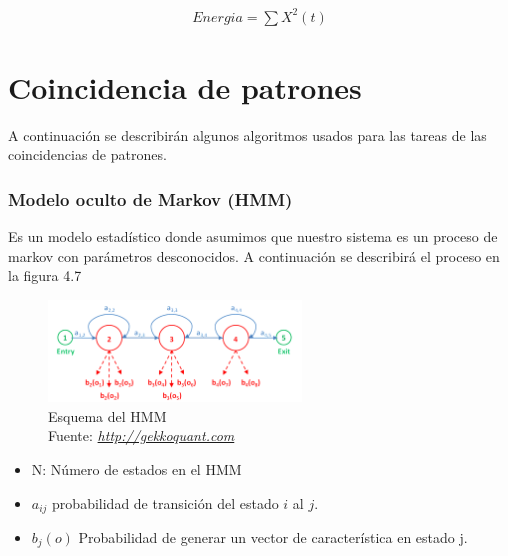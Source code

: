 	\begin{equation}
		\label{energia}
		\begin{aligned}
			Energia=\sum X^{2}(t)
		\end{aligned}
	\end{equation}	




\section{Coincidencia de patrones}
A continuación se describirán algunos algoritmos usados para las tareas de las coincidencias de patrones.

\subsubsection{Modelo oculto de Markov (HMM)}
Es un modelo estadístico donde asumimos que nuestro sistema es un proceso de markov con parámetros desconocidos. A continuación se describirá el proceso en la figura 4.7

\begin{figure}[H]
	\centering
	\includegraphics[width=0.6\textwidth]{Figures/hmm}
	\caption{Esquema del HMM\\ Fuente:  \href{http://gekkoquant.com/2014/05/18/hidden-markov-models-model-description-part-1-of-4/}{\textit{http://gekkoquant.com}}}
	\label{}
\end{figure} 
\begin{itemize}
	\item N: Número de estados en el HMM
	\item $a_{ij}$ probabilidad de transición del estado $i$ al $j$.
	\item $	b_{j}(o)$ Probabilidad de generar un vector de característica en estado j.
	
\end{itemize}
